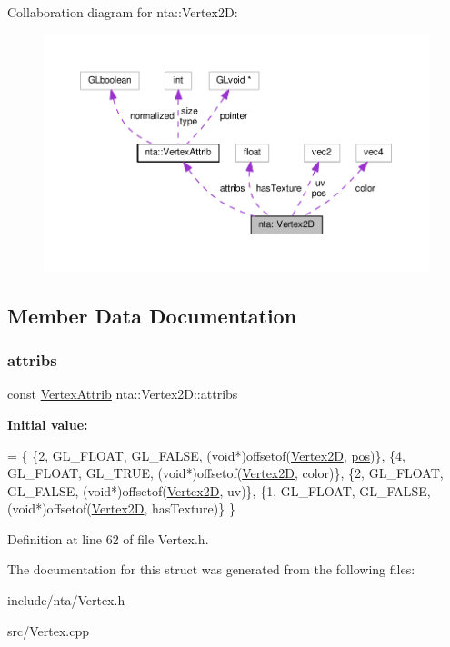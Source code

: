 Collaboration diagram for nta\+:\+:Vertex2D\+:\nopagebreak
\begin{figure}[H]
\begin{center}
\leavevmode
\includegraphics[width=350pt]{df/deb/structnta_1_1Vertex2D__coll__graph}
\end{center}
\end{figure}


\subsection{Member Data Documentation}
\mbox{\label{structnta_1_1Vertex2D_a6be835338c31e6ce40e1a2f5a3039560}} 
\subsubsection{\texorpdfstring{attribs}{attribs}}
{\footnotesize\ttfamily const \hyperlink{namespacenta_df/d9d/structnta_1_1VertexAttrib}{Vertex\+Attrib} nta\+::\+Vertex2\+D\+::attribs\hspace{0.3cm}{\ttfamily [static]}}

{\bfseries Initial value\+:}
\begin{DoxyCode}
= \{
        \{2, GL\_FLOAT, GL\_FALSE, (\textcolor{keywordtype}{void}*)offsetof(\hyperlink{structnta_1_1Vertex2D_a696744d55f56ae170684266eab073c0f}{Vertex2D}, \hyperlink{structnta_1_1Vertex2D_a27a44e1ca52b5a5a13d37495e9376636}{pos})\},
        \{4, GL\_FLOAT, GL\_TRUE,  (\textcolor{keywordtype}{void}*)offsetof(\hyperlink{structnta_1_1Vertex2D_a696744d55f56ae170684266eab073c0f}{Vertex2D}, color)\},
        \{2, GL\_FLOAT, GL\_FALSE, (\textcolor{keywordtype}{void}*)offsetof(\hyperlink{structnta_1_1Vertex2D_a696744d55f56ae170684266eab073c0f}{Vertex2D}, uv)\},
        \{1, GL\_FLOAT, GL\_FALSE, (\textcolor{keywordtype}{void}*)offsetof(\hyperlink{structnta_1_1Vertex2D_a696744d55f56ae170684266eab073c0f}{Vertex2D}, hasTexture)\}
    \}
\end{DoxyCode}


Definition at line 62 of file Vertex.\+h.



The documentation for this struct was generated from the following files\+:\begin{DoxyCompactItemize}
\item 
include/nta/Vertex.\+h\item 
src/Vertex.\+cpp\end{DoxyCompactItemize}
